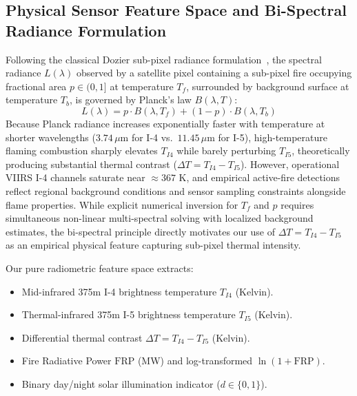 \documentclass[conference]{IEEEtran}
\begin{document}
\subsection{Physical Sensor Feature Space and Bi-Spectral Radiance Formulation}
\label{sec:dozier}
Following the classical Dozier sub-pixel radiance formulation~\cite{dozier1981,wooster2005,schroeder2014}, the spectral radiance $L(\lambda)$ observed by a satellite pixel containing a sub-pixel fire occupying fractional area $p \in (0, 1]$ at temperature $T_f$, surrounded by background surface at temperature $T_b$, is governed by Planck's law $B(\lambda, T)$:
\begin{equation}
L(\lambda) = p \cdot B(\lambda, T_f) + (1 - p) \cdot B(\lambda, T_b)
\end{equation}
Because Planck radiance increases exponentially faster with temperature at shorter wavelengths ($3.74\,\mu\text{m}$ for I-4 vs.\ $11.45\,\mu\text{m}$ for I-5), high-temperature flaming combustion sharply elevates $T_{I4}$ while barely perturbing $T_{I5}$, theoretically producing substantial thermal contrast ($\Delta T = T_{I4} - T_{I5}$). However, operational VIIRS I-4 channels saturate near $\approx 367\text{ K}$, and empirical active-fire detections reflect regional background conditions and sensor sampling constraints alongside flame properties. While explicit numerical inversion for $T_f$ and $p$ requires simultaneous non-linear multi-spectral solving with localized background estimates, the bi-spectral principle directly motivates our use of $\Delta T = T_{I4} - T_{I5}$ as an empirical physical feature capturing sub-pixel thermal intensity.

Our pure radiometric feature space extracts:
\begin{itemize}
    \item Mid-infrared 375m I-4 brightness temperature $T_{I4}$ (Kelvin).
    \item Thermal-infrared 375m I-5 brightness temperature $T_{I5}$ (Kelvin).
    \item Differential thermal contrast $\Delta T = T_{I4} - T_{I5}$ (Kelvin).
    \item Fire Radiative Power $\text{FRP}$ (MW) and log-transformed $\ln(1 + \text{FRP})$.
    \item Binary day/night solar illumination indicator ($d \in \{0, 1\}$).
\end{itemize}
\end{document}
